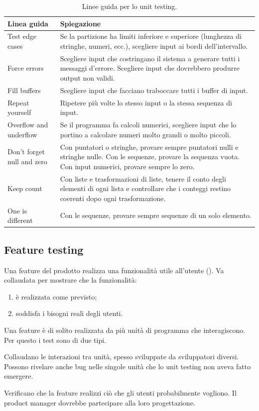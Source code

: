 \begin{table}[ht]
\centering
\small
\caption{Linee guida per lo unit testing.}
\label{tab:test-linee-guida}
\begin{tabularx}{\linewidth}{>{\raggedright\arraybackslash}p{3.4cm}X}
\toprule
Linea guida & Spiegazione \\
\midrule
Test edge cases & Se la partizione ha limiti inferiore e superiore (lunghezza di stringhe, numeri, ecc.), scegliere
  input ai bordi dell'intervallo. \\
Force errors & Scegliere input che costringano il sistema a generare tutti i messaggi d'errore. Scegliere input che
  dovrebbero produrre output non validi. \\
Fill buffers & Scegliere input che facciano traboccare tutti i buffer di input. \\
Repeat yourself & Ripetere più volte lo stesso input o la stessa sequenza di input. \\
Overflow and underflow & Se il programma fa calcoli numerici, scegliere input che lo portino a calcolare numeri molto
  grandi o molto piccoli. \\
Don't forget null and zero & Con puntatori o stringhe, provare sempre puntatori nulli e stringhe nulle. Con le
  sequenze, provare la sequenza vuota. Con input numerici, provare sempre lo zero. \\
Keep count & Con liste e trasformazioni di liste, tenere il conto degli elementi di ogni lista e controllare che i
  conteggi restino coerenti dopo ogni trasformazione. \\
One is different & Con le sequenze, provare sempre sequenze di un solo elemento. \\
\bottomrule
\end{tabularx}
\end{table}

\subsection{Feature testing}
\label{sec:test-feature}

Una feature del prodotto realizza una funzionalità utile all'utente (). Va collaudata per
mostrare che la funzionalità:
\begin{enumerate}
  \item è realizzata come previsto;
  \item soddisfa i bisogni reali degli utenti.
\end{enumerate}
Una feature è di solito realizzata da più unità di programma che interagiscono. Per questo i test sono di due tipi.
\begin{description}[leftmargin=0pt, style=unboxed]
  \item[Interaction test.] Collaudano le interazioni tra unità, spesso sviluppate da sviluppatori diversi. Possono
    rivelare anche bug nelle singole unità che lo unit testing non aveva fatto emergere.
  \item[Usefulness test.] Verificano che la feature realizzi ciò che gli utenti probabilmente vogliono. Il product
    manager dovrebbe partecipare alla loro progettazione.
\end{description}

